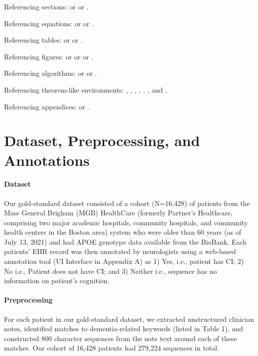 \documentclass[pmlr,twocolumn,10pt]{jmlr} %
\begin{document}
Referencing sections:  or
 or
.

Referencing equations:  or
 or
.

Referencing tables:  or
 or
.

Referencing figures:  or
 or
 or
.

Referencing algorithms:  or
 or
.

Referencing theorem-like environments: ,
, , 
, ,
,  and
.

Referencing appendices:  or
.

\section{Dataset, Preprocessing, and Annotations}

\paragraph{Dataset}
\label{sec:Dataset} Our gold-standard dataset consisted of a cohort (N=16,428) of patients from the Mass General Brigham (MGB) HealthCare (formerly Partner's Healthcare, comprising two major academic hospitals, community hospitals, and community health centers in the Boston area) system who were older than 60 years (as of July 13, 2021) and had APOE genotype data available from the BioBank. Each patients' EHR record was then annotated by neurologists using a web-based annotation tool (UI Interface in Appendix A) as 1) Yes, i.e., patient has CI; 2) No i.e., Patient does not have CI; and 3) Neither i.e., sequence has no information on patient’s cognition.

\paragraph{Preprocessing}
\label{sec:Preprocessing} For each patient in our gold-standard dataset, we extracted unstructured clinician notes, identified matches to dementia-related keywords (listed in Table 1), and constructed 800 character sequences from the note text around each of these matches. Our cohort of 16,428 patients had 279,224 sequences in total. 
\end{document}
